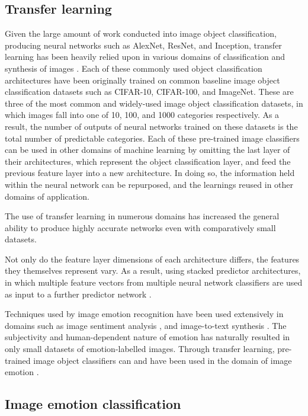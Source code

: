 \documentclass{article}
\begin{document}
\subsection{Transfer learning}

Given the large amount of work conducted into image object classification, producing neural networks such as AlexNet, ResNet, and Inception, transfer learning has been heavily relied upon in various domains of classification and synthesis of images \citep{pan2009survey}.
Each of these commonly used object classification architectures have been originally trained on common baseline image object classification datasets such as CIFAR-10, CIFAR-100, and ImageNet.
These are three of the most common and widely-used image object classification datasets, in which images fall into one of 10, 100, and 1000 categories respectively.
As a result, the number of outputs of neural networks trained on these datasets is the total number of predictable categories.
Each of these pre-trained image classifiers can be used in other domains of machine learning by omitting the last layer of their architectures, which represent the object classification layer, and feed the previous feature layer into a new architecture.
In doing so, the information held within the neural network can be repurposed, and the learnings reused in other domains of application.

The use of transfer learning in numerous domains has increased the general ability to produce highly accurate networks even with comparatively small datasets.

Not only do the feature layer dimensions of each architecture differs, the features they themselves represent vary.
As a result, using stacked predictor architectures, in which multiple feature vectors from multiple neural network classifiers are used as input to a further predictor network \citep{kim2018building}.



Techniques used by image emotion recognition have been used extensively in domains such as image sentiment analysis \citep{you2015robust}, and image-to-text synthesis \citep{vinyals2015show}.
The subjectivity and human-dependent nature of emotion has naturally resulted in only small datasets of emotion-labelled images.
Through transfer learning, pre-trained image object classifiers can and have been used in the domain of image emotion \citep{kim2018building, wangarttalk}.


\subsection{Image emotion classification}
\end{document}
